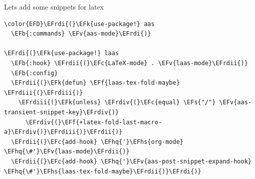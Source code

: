 \documentclass{scrartcl}
\newcommand{\EFk}[1]{\textcolor{EFk}{#1}} %
\newcommand{\EFs}[1]{\textcolor{EFs}{#1}} %
\newcommand{\EFb}[1]{\textcolor{EFb}{#1}} %
\newcommand{\EFc}[1]{\textcolor{EFc}{#1}} %
\newcommand{\EFv}[1]{\textcolor{EFv}{#1}} %
\newcommand{\EFf}[1]{\textcolor{EFf}{#1}} %
\newcommand{\EFhq}[1]{\textcolor{EFhq}{#1}} %
\newcommand{\EFhs}[1]{\textcolor{EFhs}{#1}} %
\newcommand{\EFrdi}[1]{\textcolor{EFrdi}{#1}} %
\newcommand{\EFrdii}[1]{\textcolor{EFrdii}{#1}} %
\newcommand{\EFrdiii}[1]{\textcolor{EFrdiii}{#1}} %
\newcommand{\EFrdiv}[1]{\textcolor{EFrdiv}{#1}} %
\begin{document}
Lets add some snippets for latex
\begin{Code}
\begin{Verbatim}[]
\color{EFD}\EFrdi{(}\EFk{use-package!} aas
  \EFb{:commands} \EFv{aas-mode}\EFrdi{)}

\EFrdi{(}\EFk{use-package!} laas
  \EFb{:hook} \EFrdii{(}\EFc{LaTeX-mode} . \EFv{laas-mode}\EFrdii{)}
  \EFb{:config}
  \EFrdii{(}\EFk{defun} \EFf{laas-tex-fold-maybe} \EFrdiii{(}\EFrdiii{)}
    \EFrdiii{(}\EFk{unless} \EFrdiv{(}\EFc{equal} \EFs{"/"} \EFv{aas-transient-snippet-key}\EFrdiv{)}
      \EFrdiv{(}\EFf{+latex-fold-last-macro-a}\EFrdiv{)}\EFrdiii{)}\EFrdii{)}
  \EFrdii{(}\EFc{add-hook} \EFhq{'}\EFhs{org-mode} \EFhq{\#'}\EFv{laas-mode}\EFrdii{)}
  \EFrdii{(}\EFc{add-hook} \EFhq{'}\EFv{aas-post-snippet-expand-hook} \EFhq{\#'}\EFhs{laas-tex-fold-maybe}\EFrdii{)}\EFrdi{)}

\end{Verbatim}
\end{Code}
\end{document}
